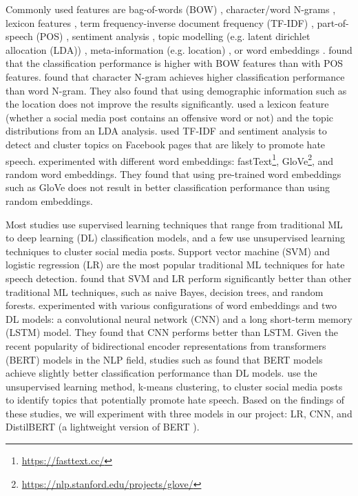 %
Commonly used features are bag-of-words (BOW) \citep{greevy2004classifying}, character/word N-grams \citep{waseem2016hateful}, lexicon features \citep{xiang2012detecting},  term frequency-inverse document frequency (TF-IDF) \citep{badjatiya2017deep, davidson2017automated, rodriguez2019automatic}, part-of-speech (POS) \citep{greevy2004classifying}, sentiment analysis \citep{rodriguez2019automatic}, topic modelling (e.g. latent dirichlet allocation (LDA)) \citep{xiang2012detecting}, meta-information (e.g. location) \citep{waseem2016hateful}, or word embeddings \citep{badjatiya2017deep, agrawal2018deep}.
%
\citet{greevy2004classifying} found that the classification performance is higher with BOW features than with POS features.
%
\citet{waseem2016hateful} found that character N-gram achieves higher classification performance than word N-gram.
%
They also found that using demographic information such as the location does not improve the results significantly.
%
\citet{xiang2012detecting} used a lexicon feature (whether a social media post contains an offensive word or not) and the topic distributions from an LDA analysis.
%
\citet{rodriguez2019automatic} used TF-IDF and sentiment analysis to detect and cluster topics on Facebook pages that are likely to promote hate speech.
%
\citet{badjatiya2017deep} experimented with different word embeddings: fastText\footnote{\url{https://fasttext.cc/}}, GloVe\footnote{\url{https://nlp.stanford.edu/projects/glove/}}, and random word embeddings.
%
They found that using pre-trained word embeddings such as GloVe does not result in better classification performance than using random embeddings.
%

Most studies use supervised learning techniques that range from traditional ML to deep learning (DL) classification models, and a few use unsupervised learning techniques to cluster social media posts.
%
Support vector machine (SVM) \citep{greevy2004classifying, xiang2012detecting,davidson2017automated} and logistic regression (LR) \citep{waseem2016hateful, davidson2017automated} are the most popular traditional ML techniques for hate speech detection.
%
\citet{davidson2017automated} found that SVM and LR perform significantly better than other traditional ML techniques, such as naive Bayes, decision trees, and random forests.
%
\citet{badjatiya2017deep} experimented with various configurations of word embeddings and two DL models: a convolutional neural network (CNN) and a long short-term memory (LSTM) model.
%
They found that CNN performs better than LSTM.
%
Given the recent popularity of bidirectional encoder representations from transformers (BERT) models \citep{devlin2018bert} in the NLP field, studies such as \citet{alatawi2021detecting} found that BERT models achieve slightly better classification performance than DL models.
%
\citet{rodriguez2019automatic} use the unsupervised learning method, k-means clustering, to cluster social media posts to identify topics that potentially promote hate speech.
%
Based on the findings of these studies, we will experiment with three models in our project: LR, CNN, and DistilBERT (a lightweight version of BERT \citep{sanh2019distilbert}).


